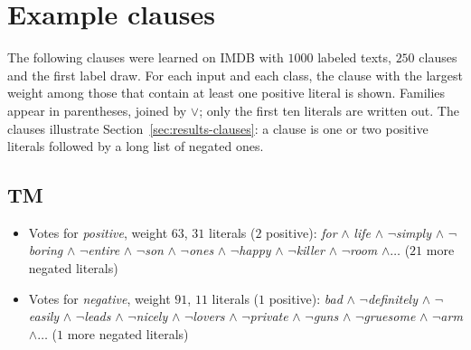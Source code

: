 \section{Example clauses}
\label{app:clauses}

The following clauses were learned on IMDB with $1000$ labeled texts, $250$ clauses and the first
label draw. For each input and each class, the clause with the largest weight among those that
contain at least one positive literal is shown. Families appear in parentheses, joined by $\lor$;
only the first ten literals are written out. The clauses illustrate Section~\ref{sec:results-clauses}:
a clause is one or two positive literals followed by a long list of negated ones.

\subsection{TM}
\begin{itemize}
  \item Votes for \emph{positive}, weight $63$, $31$ literals ($2$ positive): \textit{for} $\land$ \textit{life} $\land$ $\lnot$\textit{simply} $\land$ $\lnot$\textit{boring} $\land$ $\lnot$\textit{entire} $\land$ $\lnot$\textit{son} $\land$ $\lnot$\textit{ones} $\land$ $\lnot$\textit{happy} $\land$ $\lnot$\textit{killer} $\land$ $\lnot$\textit{room} $\land \dots$ ($21$ more negated literals)
  \item Votes for \emph{negative}, weight $91$, $11$ literals ($1$ positive): \textit{bad} $\land$ $\lnot$\textit{definitely} $\land$ $\lnot$\textit{easily} $\land$ $\lnot$\textit{leads} $\land$ $\lnot$\textit{nicely} $\land$ $\lnot$\textit{lovers} $\land$ $\lnot$\textit{private} $\land$ $\lnot$\textit{guns} $\land$ $\lnot$\textit{gruesome} $\land$ $\lnot$\textit{arm} $\land \dots$ ($1$ more negated literals)
\end{itemize}

